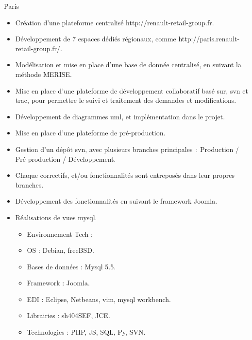 \documentclass[10pt,a4paper,sans]{moderncv}
\begin{document}
{Paris}{}{
    \begin{itemize}%
        \item Création d'une plateforme centralisé http://renault-retail-group.fr.
        \item Développement de 7 espaces dédiés régionaux, comme http://paris.renault-retail-group.fr/.
        \item Modélisation et mise en place d'une base de donnée centralisé, en suivant la méthode MERISE.
        \item Mise en place d'une plateforme de développement collaboratif basé sur, svn et trac, pour permettre le suivi et traitement des demandes et modifications.
        \item Développement de diagrammes uml, et implémentation dans le projet.
        \item Mise en place d'une plateforme de pré-production.
        \item Gestion d'un dépôt svn, avec plusieurs branches principales : Production / Pré-production / Développement.
        \item Chaque correctifs, et/ou fonctionnalités sont entreposés dans leur propres branches.
        \item Développement des fonctionnalités en suivant le framework Joomla.
        \item Réalisations de vues mysql.
            \begin{itemize}%
                \item Environnement Tech :
                \item OS : Debian, freeBSD.
                \item Bases de données : Mysql 5.5.
                \item Framework : Joomla.
                \item EDI : Eclipse, Netbeans, vim, mysql workbench.
                \item Librairies : sh404SEF, JCE.
                \item Technologies : PHP, JS, SQL, Py, SVN.
            \end{itemize}
\end{itemize}}
\end{document}
